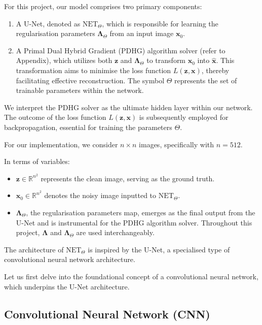 \documentclass[12pt]{article}
\begin{document}
For this project, our model comprises two primary components:
\begin{enumerate}
    \item A U-Net, denoted as $\text{NET}_{\Theta}$, which is responsible for learning the regularisation parameters $\mathbf{\Lambda}_{\Theta}$ from an input image $\mathbf{x}_0$.
    \item A Primal Dual Hybrid Gradient (PDHG) algorithm solver (refer to Appendix), which utilizes both $\mathbf{z}$ and $\mathbf{\Lambda}_{\Theta}$ to transform $\mathbf{x}_0$ into $\hat{\mathbf{x}}$. This transformation aims to minimise the loss function $L(\mathbf{z}, \mathbf{x})$, thereby facilitating effective reconstruction. The symbol $\Theta$ represents the set of trainable parameters within the network.
\end{enumerate}

We interpret the PDHG solver as the ultimate hidden layer within our network. The outcome of the loss function $L(\mathbf{z}, \mathbf{x})$ is subsequently employed for backpropagation, essential for training the parameters $\Theta$.

For our implementation, we consider $n \times n$ images, specifically with $n = 512$.

In terms of variables:
\begin{itemize}
    \item $\mathbf{z} \in \mathbb{R}^{n^2}$ represents the clean image, serving as the ground truth.
    \item $\mathbf{x}_0 \in \mathbb{R}^{n^2}$ denotes the noisy image inputted to $\text{NET}_{\Theta}$.
    \item $\mathbf{\Lambda}_{\Theta}$, the regularisation parameters map, emerges as the final output from the U-Net and is instrumental for the PDHG algorithm solver. Throughout this project, $\mathbf{\Lambda}$ and $\mathbf{\Lambda}_{\Theta}$ are used interchangeably.
\end{itemize}

The architecture of $\text{NET}_{\Theta}$ is inspired by the U-Net, a specialised type of convolutional neural network architecture.

Let us first delve into the foundational concept of a convolutional neural network, which underpins the U-Net architecture.



\subsection{
Convolutional Neural Network (CNN) 
}
\end{document}
